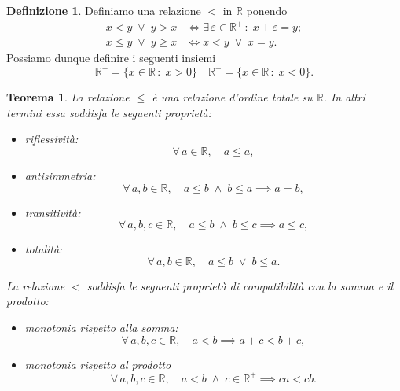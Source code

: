 \documentclass{article}
\theoremstyle{plain}
\newtheorem{thm}{Teorema}[section]
\theoremstyle{definition}
\newtheorem{defn}{Definizione}[section]
\theoremstyle{remark}
\begin{document}
\vspace{10pt}

\begin{bxthm}
\begin{defn}
    Definiamo una relazione $<$ in $\mathbb{R}$ ponendo 
    \begin{align*}
        x<y\;\lor\;y>x &\iff \exists\,\varepsilon\in\mathbb{R}^+\,:\;x+\varepsilon=y;\\
        x\leq y \;\lor\;y\geq x&\iff x<y\;\lor\;x=y.
    \end{align*}
    Possiamo dunque definire i seguenti insiemi
    \[\mathbb{R}^+=\{x\in\mathbb{R}\,:\;x>0\} \quad \mathbb{R}^-=\{x\in\mathbb{R}\,:\;x<0\}.  \]
\end{defn}
\end{bxthm}

\vspace{10pt}

\begin{bxthm}
\begin{thm}
    La relazione $\leq$ è una relazione d'ordine totale su $\mathbb{R}$. In altri termini essa soddisfa le seguenti proprietà:
    \begin{itemize}
        \item[$a$] \textit{riflessività}: 
        \[\forall\,a\in\mathbb{R},\quad a\leq a,\]
        \item[$b$] \textit{antisimmetria}: 
        \[\forall\,a,b\in\mathbb{R},\quad a\leq b\;\land\; b\leq a \implies a=b,\]
        \item[$c$] \textit{transitività}:
        \[\forall\,a,b,c\in\mathbb{R},\quad a\leq b\;\land\; b\leq c \implies a\leq c,\]
        \item[$d$] \textit{totalità}:
        \[\forall\,a,b\in\mathbb{R},\quad a\leq b\;\lor\;b\leq a .\]
    \end{itemize}
    La relazione $<$ soddisfa le seguenti proprietà di compatibilità con la somma e il prodotto:
    \begin{itemize}
        \item[$e$] \textit{monotonia rispetto alla somma}: 
        \[\forall\,a,b,c\in\mathbb{R},\quad a<b \implies a+c<b+c,\]
        \item[$f$] \textit{monotonia rispetto al prodotto}
        \[\forall\,a,b,c\in\mathbb{R},\quad a<b \;\land\; c\in\mathbb{R}^+ \implies ca<cb.\]
    \end{itemize}
\end{thm}
\end{bxthm}
\end{document}

